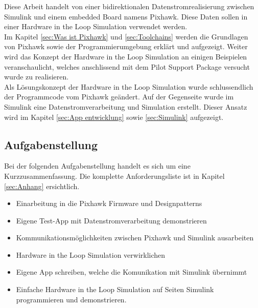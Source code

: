 Diese Arbeit handelt von einer bidirektionalen Datenstromrealisierung zwischen Simulink und einem embedded Board namens Pixhawk. Diese Daten sollen in einer Hardware in the Loop Simulation verwendet werden.\\

\noindent Im Kapitel \ref{sec:Was ist Pixhawk} und \ref{sec:Toolchains} werden die Grundlagen von Pixhawk sowie der Programmierumgebung erklärt und aufgezeigt. Weiter wird das Konzept der Hardware in the Loop Simulation an einigen Beispielen veranschaulicht, welches anschlissend mit dem Pilot Support Package versucht wurde zu realisieren.\\

\noindent Als Lösungskonzept der Hardware in the Loop Simulation wurde schlussendlich der Programmcode vom Pixhawk geändert. Auf der Gegenseite wurde im Simulink eine Datenstromverarbeitung und Simulation erstellt. Dieser Ansatz wird im Kapitel \ref{sec:App entwicklung} sowie \ref{sec:Simulink} aufgezeigt.



\subsection{Aufgabenstellung}

Bei der folgenden Aufgabenstellung handelt es sich um eine Kurzzusammenfassung. Die komplette Anforderungsliste ist in Kapitel \ref{sec:Anhang} ersichtlich.

\begin{itemize}
\item Einarbeitung in die Pixhawk Firmware und Designpatterns
\item Eigene Test-App mit Datenstromverarbeitung demonstrieren
\item Kommunikationsmöglichkeiten zwischen Pixhawk und Simulink ausarbeiten
\item Hardware in the Loop Simulation verwirklichen
\item Eigene App schreiben, welche die Komunikation mit Simulink übernimmt
\item Einfache Hardware in the Loop Simulation auf Seiten Simulink programmieren und demonstrieren.
\end{itemize}

\clearpage